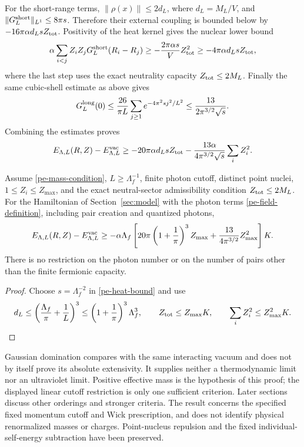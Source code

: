 For the short-range terms, \(\|\rho(x)\|\le2d_L\), where
\(d_L=M_L/V\), and
\(\|G_L^{\rm short}\|_{L^1}\le8\pi s\). Therefore their external
coupling is bounded below by \(-16\pi\alpha d_LsZ_{\rm tot}\).
Positivity of the heat kernel gives the nuclear lower bound
\[
\alpha\sum_{i<j}Z_iZ_jG_L^{\rm short}(R_i-R_j)
\ge-\frac{2\pi\alpha s}{V}Z_{\rm tot}^2
\ge-4\pi\alpha d_LsZ_{\rm tot},
\]
where the last step uses the exact neutrality capacity
\(Z_{\rm tot}\le2M_L\). Finally the same cubic-shell estimate as
above gives
\[
G_L^{\rm long}(0)
\le\frac{26}{\pi L}\sum_{j\ge1}
           e^{-4\pi^2sj^2/L^2}
\le\frac{13}{2\pi^{3/2}\sqrt s}.
\]
Combining the estimates proves
\begin{equation}
E_{\Lambda,L}(R,Z)-E^{\rm vac}_{\Lambda,L}
\ge-20\pi\alpha d_LsZ_{\rm tot}
 -\frac{13\alpha}{4\pi^{3/2}\sqrt s}\sum_iZ_i^2.
\label{pe-heat-bound}
\end{equation}

\begin{theorem}
\label{pe-full-theorem}
Assume \eqref{pe-mass-condition}, \(L\ge\Lambda_f^{-1}\), finite
photon cutoff, distinct point nuclei, \(1\le Z_i\le Z_{\max}\),
and the exact neutral-sector admissibility condition
\(Z_{\rm tot}\le2M_L\). For the Hamiltonian of Section~\ref{sec:model}
with the photon terms \eqref{pe-field-definition}, including pair
creation and quantized photons,
\begin{equation}
E_{\Lambda,L}(R,Z)-E^{\rm vac}_{\Lambda,L}
\ge-\alpha\Lambda_f
\left[20\pi\left(1+\frac1\pi\right)^3Z_{\max}
 +\frac{13}{4\pi^{3/2}}Z_{\max}^2\right]K.
\label{pe-full-bound}
\end{equation}
There is no restriction on the photon number or on the number of pairs
other than the finite fermionic capacity.
\end{theorem}

\begin{proof}
Choose \(s=\Lambda_f^{-2}\) in \eqref{pe-heat-bound} and use
\[
d_L\le\left(\frac{\Lambda_f}{\pi}+\frac1L\right)^3
\le\left(1+\frac1\pi\right)^3\Lambda_f^3,
\qquad Z_{\rm tot}\le Z_{\max}K,
\qquad \sum_iZ_i^2\le Z_{\max}^2K.
\]
\end{proof}

Gaussian domination compares with the same interacting vacuum and
does not by itself prove its absolute extensivity.
It supplies neither a thermodynamic limit nor an ultraviolet limit.
Positive effective mass is the hypothesis of this proof; the displayed
linear cutoff restriction is only one sufficient criterion.
Later sections discuss other orderings and stronger criteria.
The result concerns the specified
fixed momentum cutoff and Wick prescription, and does not identify
physical renormalized masses or charges. Point-nucleus repulsion and
the fixed individual-self-energy subtraction have been preserved.
